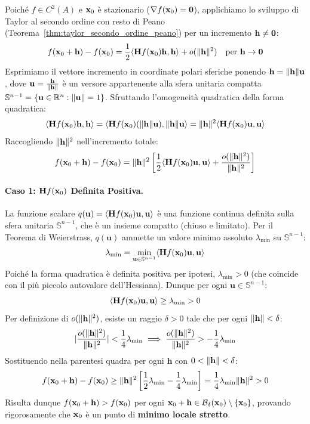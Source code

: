 \begin{dimostrazione}
Poiché $f \in C^2(A)$ e $\mathbf{x}_0$ è stazionario ($\nabla f(\mathbf{x}_0) = \mathbf{0}$), applichiamo lo sviluppo di Taylor al secondo ordine con resto di Peano (Teorema~\ref{thm:taylor_secondo_ordine_peano}) per un incremento $\mathbf{h} \neq \mathbf{0}$:
\[
f(\mathbf{x}_0 + \mathbf{h}) - f(\mathbf{x}_0) = \frac{1}{2} \langle\mathbf{H} f(\mathbf{x}_0)\mathbf{h}, \mathbf{h}\rangle + o(\lVert\mathbf{h}\rVert^2) \quad \text{per } \mathbf{h} \to \mathbf{0}
\]
Esprimiamo il vettore incremento in coordinate polari sferiche ponendo $\mathbf{h} = \lVert\mathbf{h}\rVert \mathbf{u}$, dove $\mathbf{u} = \frac{\mathbf{h}}{\lVert\mathbf{h}\rVert}$ è un versore appartenente alla sfera unitaria compatta $\mathbb{S}^{n-1} = \{\mathbf{u} \in \mathbb{R}^n : \lVert\mathbf{u}\rVert = 1\}$.
Sfruttando l'omogeneità quadratica della forma quadratica:
\[
\langle\mathbf{H} f(\mathbf{x}_0)\mathbf{h}, \mathbf{h}\rangle = \langle\mathbf{H} f(\mathbf{x}_0)(\lVert\mathbf{h}\rVert\mathbf{u}), \lVert\mathbf{h}\rVert\mathbf{u}\rangle = \lVert\mathbf{h}\rVert^2 \langle\mathbf{H} f(\mathbf{x}_0)\mathbf{u}, \mathbf{u}\rangle
\]
Raccogliendo $\lVert\mathbf{h}\rVert^2$ nell'incremento totale:
\[
f(\mathbf{x}_0 + \mathbf{h}) - f(\mathbf{x}_0) = \lVert\mathbf{h}\rVert^2 \left[ \frac{1}{2} \langle\mathbf{H} f(\mathbf{x}_0)\mathbf{u}, \mathbf{u}\rangle + \frac{o(\lVert\mathbf{h}\rVert^2)}{\lVert\mathbf{h}\rVert^2} \right]
\]
\paragraph{Caso 1: $\mathbf{H} f(\mathbf{x}_0)$ Definita Positiva.}
La funzione scalare $q(\mathbf{u}) = \langle\mathbf{H} f(\mathbf{x}_0)\mathbf{u}, \mathbf{u}\rangle$ è una funzione continua definita sulla sfera unitaria $\mathbb{S}^{n-1}$, che è un insieme compatto (chiuso e limitato). Per il Teorema di Weierstrass, $q(\mathbf{u})$ ammette un valore minimo assoluto $\lambda_{\min}$ su $\mathbb{S}^{n-1}$:
\[
\lambda_{\min} = \min_{\mathbf{u} \in \mathbb{S}^{n-1}} \langle\mathbf{H} f(\mathbf{x}_0)\mathbf{u}, \mathbf{u}\rangle
\]
Poiché la forma quadratica è definita positiva per ipotesi, $\lambda_{\min} > 0$ (che coincide con il più piccolo autovalore dell'Hessiana).
Dunque per ogni $\mathbf{u} \in \mathbb{S}^{n-1}$:
\[
\langle\mathbf{H} f(\mathbf{x}_0)\mathbf{u}, \mathbf{u}\rangle \ge \lambda_{\min} > 0
\]
Per definizione di $o(\lVert\mathbf{h}\rVert^2)$, esiste un raggio $\delta > 0$ tale che per ogni $\lVert\mathbf{h}\rVert < \delta$:
\[
\lvert\frac{o(\lVert\mathbf{h}\rVert^2)}{\lVert\mathbf{h}\rVert^2}\rvert < \frac{1}{4} \lambda_{\min} \implies \frac{o(\lVert\mathbf{h}\rVert^2)}{\lVert\mathbf{h}\rVert^2} > -\frac{1}{4} \lambda_{\min}
\]
Sostituendo nella parentesi quadra per ogni $\mathbf{h}$ con $0 < \lVert\mathbf{h}\rVert < \delta$:
\[
f(\mathbf{x}_0 + \mathbf{h}) - f(\mathbf{x}_0) \ge \lVert\mathbf{h}\rVert^2 \left[ \frac{1}{2} \lambda_{\min} - \frac{1}{4} \lambda_{\min} \right] = \frac{1}{4} \lambda_{\min} \lVert\mathbf{h}\rVert^2 > 0
\]
Risulta dunque $f(\mathbf{x}_0 + \mathbf{h}) > f(\mathbf{x}_0)$ per ogni $\mathbf{x}_0 + \mathbf{h} \in \mathcal{B}_\delta(\mathbf{x}_0) \setminus \{\mathbf{x}_0\}$, provando rigorosamente che $\mathbf{x}_0$ è un punto di \textbf{minimo locale stretto}.


\end{dimostrazione}
